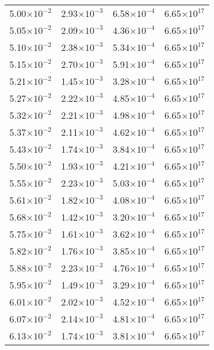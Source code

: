 \documentclass{aa}
\begin{document}
{\begin{longtable}{c|c|c|c}
5.00$\times 10^{-2}$ & 2.93$\times 10^{-3}$ & 6.58$\times 10^{-4}$ & 6.65$\times 10^{17}$  \\
5.05$\times 10^{-2}$ & 2.09$\times 10^{-3}$ & 4.36$\times 10^{-4}$ & 6.65$\times 10^{17}$  \\
5.10$\times 10^{-2}$ & 2.38$\times 10^{-3}$ & 5.34$\times 10^{-4}$ & 6.65$\times 10^{17}$  \\
5.15$\times 10^{-2}$ & 2.70$\times 10^{-3}$ & 5.91$\times 10^{-4}$ & 6.65$\times 10^{17}$  \\
5.21$\times 10^{-2}$ & 1.45$\times 10^{-3}$ & 3.28$\times 10^{-4}$ & 6.65$\times 10^{17}$  \\
5.27$\times 10^{-2}$ & 2.22$\times 10^{-3}$ & 4.85$\times 10^{-4}$ & 6.65$\times 10^{17}$  \\
5.32$\times 10^{-2}$ & 2.21$\times 10^{-3}$ & 4.98$\times 10^{-4}$ & 6.65$\times 10^{17}$  \\
5.37$\times 10^{-2}$ & 2.11$\times 10^{-3}$ & 4.62$\times 10^{-4}$ & 6.65$\times 10^{17}$  \\
5.43$\times 10^{-2}$ & 1.74$\times 10^{-3}$ & 3.84$\times 10^{-4}$ & 6.65$\times 10^{17}$  \\
5.50$\times 10^{-2}$ & 1.93$\times 10^{-3}$ & 4.21$\times 10^{-4}$ & 6.65$\times 10^{17}$  \\
5.55$\times 10^{-2}$ & 2.23$\times 10^{-3}$ & 5.03$\times 10^{-4}$ & 6.65$\times 10^{17}$  \\
5.61$\times 10^{-2}$ & 1.82$\times 10^{-3}$ & 4.08$\times 10^{-4}$ & 6.65$\times 10^{17}$  \\
5.68$\times 10^{-2}$ & 1.42$\times 10^{-3}$ & 3.20$\times 10^{-4}$ & 6.65$\times 10^{17}$  \\
5.75$\times 10^{-2}$ & 1.61$\times 10^{-3}$ & 3.62$\times 10^{-4}$ & 6.65$\times 10^{17}$  \\
5.82$\times 10^{-2}$ & 1.76$\times 10^{-3}$ & 3.85$\times 10^{-4}$ & 6.65$\times 10^{17}$  \\
5.88$\times 10^{-2}$ & 2.23$\times 10^{-3}$ & 4.76$\times 10^{-4}$ & 6.65$\times 10^{17}$  \\
5.95$\times 10^{-2}$ & 1.49$\times 10^{-3}$ & 3.29$\times 10^{-4}$ & 6.65$\times 10^{17}$  \\
6.01$\times 10^{-2}$ & 2.02$\times 10^{-3}$ & 4.52$\times 10^{-4}$ & 6.65$\times 10^{17}$  \\
6.07$\times 10^{-2}$ & 2.14$\times 10^{-3}$ & 4.81$\times 10^{-4}$ & 6.65$\times 10^{17}$  \\
6.13$\times 10^{-2}$ & 1.74$\times 10^{-3}$ & 3.81$\times 10^{-4}$ & 6.65$\times 10^{17}$  \\

\end{longtable}}
\end{document}
